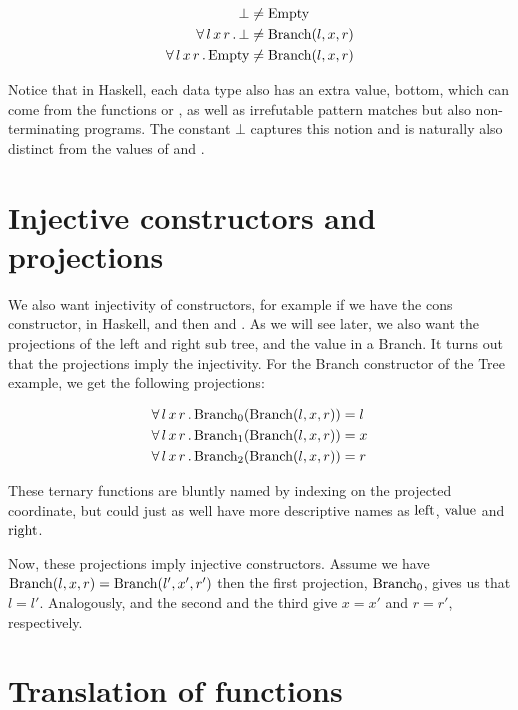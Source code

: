 \begin{align*}
\mathrm{\bot} &  \neq \mathrm{Empty}\\
 \forall \, l \,  x \,  r \,  . \,  \mathrm{\bot} &  \neq \mathrm{Branch}(l,x,r)\\
 \forall \, l \,  x \,  r \,  . \,  \mathrm{Empty} &  \neq \mathrm{Branch}(l,x,r)
\end{align*}

Notice that in Haskell, each data type also has an extra value, bottom, which
can come from the functions  or , as well as
irrefutable pattern matches but also non-terminating programs. The constant
$\bot$ captures this notion and is naturally also distinct from the values
of  and .

\section{Injective constructors and projections}

We also want injectivity of constructors, for example if we have the
cons constructor, \hs{:} in Haskell, and  then
 and . As we will see later, we also want the
projections of the left and right sub tree, and the value in a Branch.
It turns out that the projections imply the injectivity. For the Branch
constructor of the Tree example, we get the following projections:

\begin{align*}
 \forall \, l \, x \, r \, . \,  \mathrm{Branch_{0}}(\mathrm{Branch}(l,x,r)) &  = l\\
 \forall \, l \, x \, r \, . \,  \mathrm{Branch_{1}}(\mathrm{Branch}(l,x,r)) &  = x\\
 \forall \, l \, x \, r \, . \,  \mathrm{Branch_{2}}(\mathrm{Branch}(l,x,r)) &  = r
\end{align*}

These ternary functions are bluntly named by indexing on the projected
coordinate, but could just as well have more descriptive names as
$\mathrm{left}$, $\mathrm{value}$ and $\mathrm{right}$.

Now, these projections imply injective constructors. Assume we have
$\mathrm{Branch}(l,x,r) = \mathrm{Branch}(l',x',r')$ then the first
projection, $\mathrm{Branch_0}$, gives us that $l=l'$. Analogously,
and the second and the third give $x=x'$ and $r=r'$, respectively.

\section{Translation of functions}

